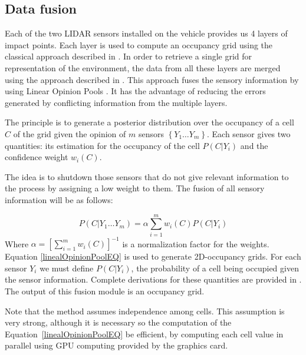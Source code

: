 \subsection{Data fusion}

Each of the  two LIDAR sensors installed on the vehicle provides us 4 layers of impact points. Each layer is used to compute an occupancy grid using the classical approach described in \cite{Thrun05}. In order to retrieve a single grid for representation of the environment, the data from all these layers are merged using the approach described in \cite{ADARVE-2012-671211}. This approach fuses the sensory information by using Linear Opinion Pools \cite{DeGroot1974}. It has the advantage of reducing the errors generated by conflicting information from the multiple layers.

The principle is to generate a posterior distribution over the occupancy of a cell $C$ of the grid given the opinion of $m$ sensors $\left\{ Y_1 \dots Y_m \right\}$.
Each sensor gives two quantities: its estimation for the occupancy of the cell $P(C | Y_i)$ and the confidence weight $w_i(C)$.

The idea is to shutdown those sensors that do not give relevant information to the process by assigning a low weight to them. The fusion of all sensory information will be as follows:

\begin{equation}
\label{linealOpinionPoolEQ}
  P(C | Y_1 \dots Y_m) = \alpha \sum \limits^m_{i=1} w_i(C) P(C | Y_i)
\end{equation}
Where $\alpha = \left[ \sum \limits^m_{i=1} w_i(C) \right]^{-1}$ is a normalization factor for the weights.  Equation \eqref{linealOpinionPoolEQ} is used to generate
2D-occupancy grids. For each sensor $Y_i$ we must define $P(C | Y_i)$, the probability of a cell being occupied given the sensor information. Complete derivations for these quantities are provided in \cite{ADARVE-2012-671211}. The output of this fusion module is an occupancy grid. %

Note that the method assumes independence among cells. This assumption is very strong, although it is necessary so the computation of the Equation~\eqref{linealOpinionPoolEQ} be efficient, by computing each cell value in parallel using GPU computing provided by the graphics card.


